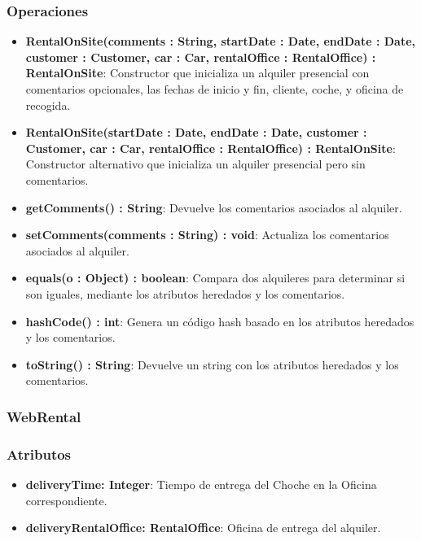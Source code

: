 \subsubsection*{Operaciones}

\begin{itemize}
    \item \textbf{RentalOnSite(comments : String, startDate : Date, endDate : Date, customer : Customer, car : Car, rentalOffice : RentalOffice) : RentalOnSite}: 
    Constructor que inicializa un alquiler presencial con comentarios opcionales, las fechas de inicio y fin, cliente, coche, y oficina de recogida.

    \item \textbf{RentalOnSite(startDate : Date, endDate : Date, customer : Customer, car : Car, rentalOffice : RentalOffice) : RentalOnSite}: 
    Constructor alternativo que inicializa un alquiler presencial pero sin comentarios.

    \item \textbf{getComments() : String}: Devuelve los comentarios asociados al alquiler.
    \item \textbf{setComments(comments : String) : void}: Actualiza los comentarios asociados al alquiler.
    \item \textbf{equals(o : Object) : boolean}: Compara dos alquileres para determinar si son iguales, mediante los atributos heredados y los comentarios.
    \item \textbf{hashCode() : int}: Genera un código hash basado en los atributos heredados y los comentarios.
    \item \textbf{toString() : String}: Devuelve un string con los atributos heredados y los comentarios.
\end{itemize}

\subsubsection{WebRental}

\subsubsection*{Atributos}

\begin{itemize}
    \item \textbf{deliveryTime: Integer}: Tiempo de entrega del Choche en la Oficina correspondiente. 
    \item \textbf{deliveryRentalOffice: RentalOffice}: Oficina de entrega del alquiler.
\end{itemize}

